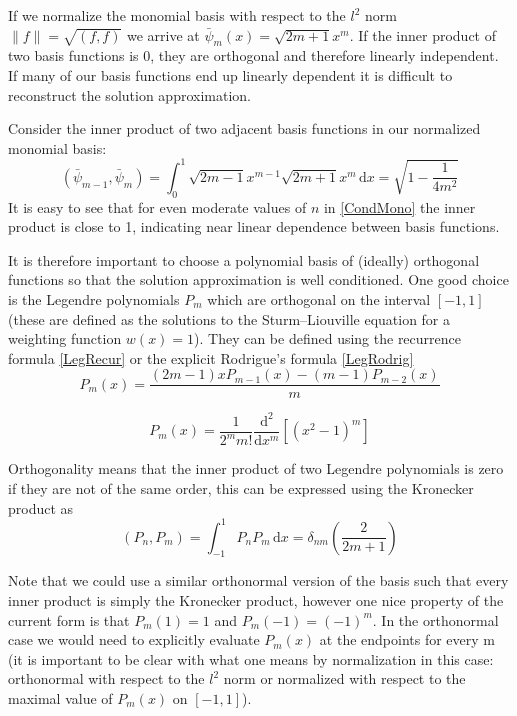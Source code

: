\documentclass[letterpaper]{article}
\begin{document}
If we normalize the monomial basis with respect to the $l^2$ norm $\|f\|=\sqrt{(f,f)}$ we arrive at $\bar{\psi}_m(x) = \sqrt{2m+1}x^m$. If the inner product of two basis functions is 0, they are orthogonal and therefore linearly independent. If many of our basis functions end up linearly dependent it is difficult to reconstruct the solution approximation.

Consider the inner product of two adjacent basis functions in our normalized monomial basis:
	\begin{equation}\label{CondMono}
	(\bar{\psi}_{m-1},\bar{\psi}_m) = \int_0^1 \! \sqrt{2m-1}x^{m-1}\sqrt{2m+1}x^{m} \, \mathrm{d}x = \sqrt{1-\frac{1}{4m^2}}
	\end{equation}
It is easy to see that for even moderate values of $n$ in \eqref{CondMono} the inner product is close to 1, indicating near linear dependence between basis functions.

It is therefore important to choose a polynomial basis of (ideally) orthogonal functions so that the solution approximation is well conditioned. One good choice is the Legendre polynomials $P_m$ which are orthogonal on the interval $[-1,1]$ (these are defined as the solutions to the Sturm–Liouville equation for a weighting function $w(x)=1$). They can be defined using the recurrence formula \eqref{LegRecur} or the explicit Rodrigue's formula \eqref{LegRodrig}
	\begin{equation}\label{LegRecur}
	P_m(x) = \frac{(2m-1)xP_{m-1}(x) - (m-1)P_{m-2}(x)}{m}
	\end{equation}

	\begin{equation}\label{LegRodrig}
	P_m(x) = \frac{1}{2^m m!}\frac{\mathrm{d}^2}{\mathrm{d}x^m}\left[(x^2-1)^m\right]
	\end{equation}

Orthogonality means that the inner product of two Legendre polynomials is zero if they are not of the same order, this can be expressed using the Kronecker product as
	\begin{equation}\label{LegInnerProd}
	(P_n,P_m) = \int_{-1}^1 \! P_n P_m \, \mathrm{d}x = \delta_{nm} \left(\frac{2}{2m+1}\right)
	\end{equation}

Note that we could use a similar orthonormal version of the basis such that every inner product is simply the Kronecker product, however one nice property of the current form is that $P_m(1)=1$ and $P_m(-1)=(-1)^m$. In the orthonormal case we would need to explicitly evaluate $P_m(x)$ at the endpoints for every m (it is important to be clear with what one means by normalization in this case: orthonormal with respect to the $l^2$ norm or normalized with respect to the maximal value of $P_m(x)$ on $[-1,1]$).
\end{document}
